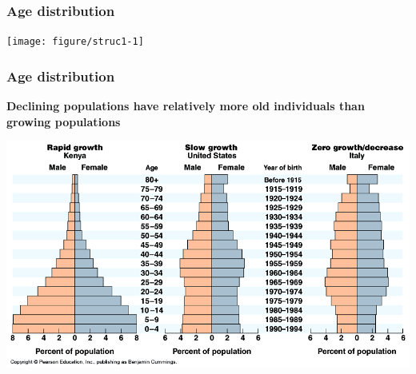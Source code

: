 \documentclass[color=usenames,dvipsnames]{beamer}\usepackage[]{graphicx}\usepackage[]{color}
\newenvironment{knitrout}{}{} %
\begin{document}
\begin{frame}[fragile]
  \frametitle{Age distribution}
\begin{knitrout}
\color{fgcolor}

{\centering \texttt{[image: figure/struc1-1]} 

}



\end{knitrout}
\end{frame}




\begin{frame}
  \frametitle{Age distribution}
  {\centering \bf Declining populations have relatively more old individuals than
  growing populations \\}
  \begin{center}
    \includegraphics[width=\textwidth]{figs/AgeStructures}
  \end{center}
\end{frame}
\end{document}
